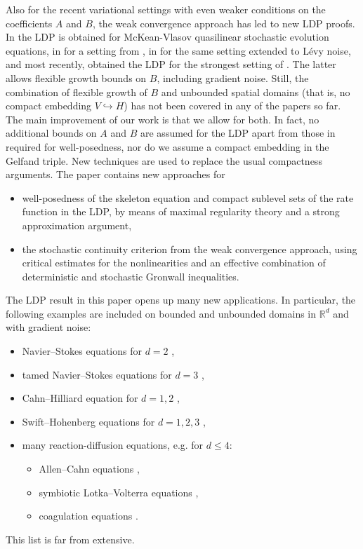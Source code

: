 \documentclass{amsart}
\newcommand{\<}{\langle}
\newcommand{\?}{\rangle}
\newcommand{\into}{\hookrightarrow}
\theoremstyle{plain}
\theoremstyle{remark}
\theoremstyle{plain}
\numberwithin{equation}{section}
\def\R{{\mathbb R}}
\begin{document}
Also for the recent variational settings with even weaker conditions on the coefficients $A$ and $B$,  the weak convergence approach has led to new LDP proofs. In \cite{hongliliu21} the LDP is obtained for McKean-Vlasov quasilinear stochastic evolution equations, in \cite{pan22} for a setting from \cite{rockner22}, in \cite{kumarmohan22} for the same setting extended to L\'evy noise, and most recently, \cite{pan24} obtained the LDP for the strongest setting of \cite{rockner22}. The latter allows flexible growth bounds on $B$,   including gradient noise. Still, the combination of flexible growth of $B$ and unbounded spatial domains (that is, no compact embedding $V\into H$) has not been covered in any of the papers so far. The main improvement of our work is that we allow for both. In fact, no additional bounds on $A$ and $B$ are assumed for the LDP apart from those in \cite{AV22variational} required for well-posedness, nor do we assume a compact embedding in the Gelfand triple. New techniques are used to replace the usual  compactness arguments. The paper contains new approaches for
\begin{itemize}[label=$-$]
  \item well-posedness of the skeleton equation and  compact sublevel sets of the rate function in the LDP, by means of maximal regularity theory and a strong approximation argument,
  \item the stochastic continuity criterion from the weak convergence approach, using critical estimates for the nonlinearities and an effective combination of deterministic and  stochastic Gronwall inequalities.
\end{itemize}

The LDP result in this paper opens up many new applications.
In particular, the following examples are included on bounded and unbounded domains in $\R^d$ and with gradient noise:
\begin{itemize}[label=$-$]
  \item Navier--Stokes equations for $d=2$ \cite[App. A]{AV24SNS},
  \item tamed Navier--Stokes equations for $d=3$ \cite[\S 5.2]{AV22variational},
  \item Cahn--Hilliard equation for $d=1,2$ \cite[\S 5.1]{AV22variational},
  \item Swift--Hohenberg equations for $d=1,2,3$  \cite[\S 5.6]{AV22variational},
 \item many reaction-diffusion equations, e.g. \!for $d\leq 4$:
 \begin{itemize}[label=--]
   \item Allen--Cahn equations \cite[\S 5.4]{AV22variational},
   \item symbiotic Lotka--Volterra equations \cite[Th. 3.11]{AV24reacdiff-arXiv},
   \item coagulation equations \cite[Th. 3.9]{AV24reacdiff-arXiv}.
 \end{itemize}
 \end{itemize}
 This list is far from extensive.
 
\end{document}
